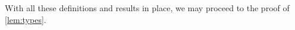 \begin{comment}
We will prove the following strengthening of~\cref{lem:types}:

\begin{lemma}%
  \label{lem:types1}
For any given number $q\in\N$ one can compute 
 a number $r\in\N$ with the following property.
	For any graph $G=(V,E)$, sets of vertices $A,B,S\subset V$	
	such that $A$  and $B$ are $r$-separated by $S$,
	for every tuple $\bar u\in A^{d}$, 
	the type $\tp^q_G(\bar u/B)$
	is computable from $\tp^{q}[B^r_S(\bar u), \bar u]$, and $G$ and $S$.
	
	
	
\end{lemma}

To show that~\cref{lem:types1} implies~\cref{lem:types}, define $p$ as $q\cdot r$. It suffices to show that
$\tp^{q}[B^r_S(\bar u), \bar u]$ is computable from $\tp_G^p(\bar u/S)$, and $G$ and $S$. This is the case, since
a formula $\phi(\bar y)$
can be relativized to $B^r_S(\bar u)$
by replacing each quantifier $\exists x$ by a formula
$\exists x\exists x_1\ldots\exists x_r\psi (x,x_1,\ldots,x_r)$,
where $\psi$ specifies that $x_1,\ldots,x_r,x$ form a path
starting in one of the vertices in $\bar u$, ending in $x$,
and omitting all vertices in $S$, which are enumerated as parameters.

It remains to prove~\cref{lem:types1}.
\end{comment}


With all these definitions and results in place, we may proceed to the proof of \cref{lem:types}.

